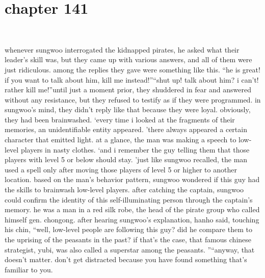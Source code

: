 \section{chapter 141}

                             




whenever sungwoo interrogated the kidnapped pirates, he asked what their leader’s skill was, but they came up with various answers, and all of them were just ridiculous.
among the replies they gave were something like this.
“he is great! if you want to talk about him, kill me instead!”“shut up! talk about him? i can’t! rather kill me!”until just a moment prior, they shuddered in fear and answered without any resistance, but they refused to testify as if they were programmed.
in sungwoo’s mind, they didn’t reply like that because they were loyal.
obviously, they had been brainwashed.
‘every time i looked at the fragments of their memories, an unidentifiable entity appeared.
’there always appeared a certain character that emitted light.
 at a glance, the man was making a speech to low-level players in nasty clothes.
‘and i remember the guy telling them that those players with level 5 or below should stay.
’just like sungwoo recalled, the man used a spell only after moving those players of level 5 or higher to another location.
 based on the man’s behavior pattern, sungwoo wondered if this guy had the skills to brainwash low-level players.
after catching the captain, sungwoo could confirm the identity of this self-illuminating person through the captain’s memory.
he was a man in a red silk robe, the head of the pirate group who called himself gen.
 chongong.
after hearing sungwoo’s explanation, hanho said, touching his chin, “well, low-level people are following this guy? did he compare them to the uprising of the peasants in the past? if that’s the case, that famous chinese strategist, yubi, was also called a superstar among the peasants.
”“anyway, that doesn’t matter.
 don’t get distracted because you have found something that’s familiar to you.

